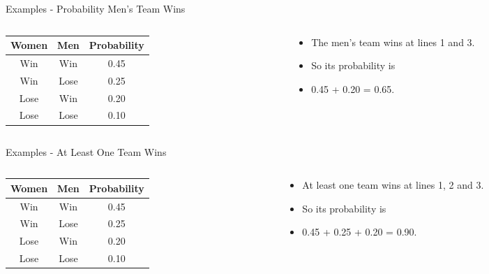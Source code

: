 \documentclass[
  ignorenonframetext,
]{beamer}
\providecommand{\tightlist}{%
  \setlength{\itemsep}{0pt}\setlength{\parskip}{0pt}}
\begin{document}
\begin{frame}{Examples - Probability Men's Team Wins}
\protect\hypertarget{examples---probability-mens-team-wins}{}
\begin{columns}[T]
\begin{column}{0.48\textwidth}
\begin{longtable}[]{@{}ccc@{}}
\toprule
Women & Men & Probability \\
\midrule
\endhead
Win & Win & 0.45 \\
Win & Lose & 0.25 \\
Lose & Win & 0.20 \\
Lose & Lose & 0.10 \\
\bottomrule
\end{longtable}
\end{column}

\begin{column}{0.48\textwidth}
\bigskip

\begin{itemize}
\tightlist
\item
  The men's team wins at lines 1 and 3.
\item
  So its probability is
\item
  0.45 + 0.20 = 0.65.
\end{itemize}
\end{column}
\end{columns}
\end{frame}

\begin{frame}{Examples - At Least One Team Wins}
\protect\hypertarget{examples---at-least-one-team-wins}{}
\begin{columns}[T]
\begin{column}{0.48\textwidth}
\begin{longtable}[]{@{}ccc@{}}
\toprule
Women & Men & Probability \\
\midrule
\endhead
Win & Win & 0.45 \\
Win & Lose & 0.25 \\
Lose & Win & 0.20 \\
Lose & Lose & 0.10 \\
\bottomrule
\end{longtable}
\end{column}

\begin{column}{0.48\textwidth}
\bigskip

\begin{itemize}
\tightlist
\item
  At least one team wins at lines 1, 2 and 3.
\item
  So its probability is
\item
  0.45 + 0.25 + 0.20 = 0.90.
\end{itemize}
\end{column}
\end{columns}
\end{frame}
\end{document}
